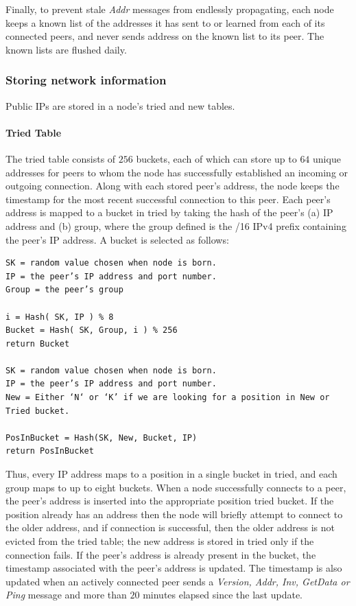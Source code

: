 Finally, to prevent stale \textsl{Addr} messages from endlessly propagating, each node keeps a known list of the addresses it has sent to or learned from each of its connected peers, and never sends address on the known list to its peer. The known lists are flushed daily.

\subsubsection*{Storing network information}
Public IPs are stored in a node’s tried and new tables.
\paragraph*{Tried Table}
The tried table consists of $256$ buckets, each of which can store up to $64$ unique addresses for peers to whom the node has successfully established an incoming or outgoing connection. Along with each stored peer’s address, the node keeps the timestamp for the most recent successful connection to this peer.
Each peer’s address is mapped to a bucket in tried by taking the hash of the peer’s (a) IP address and (b) group, where the group defined is the /16 IPv4 prefix containing the peer’s IP address. A bucket is selected as follows:
\begin{verbatim}
SK = random value chosen when node is born.
IP = the peer’s IP address and port number.
Group = the peer’s group

i = Hash( SK, IP ) % 8
Bucket = Hash( SK, Group, i ) % 256
return Bucket

SK = random value chosen when node is born.
IP = the peer’s IP address and port number.
New = Either ‘N‘ or ‘K’ if we are looking for a position in New or Tried bucket.

PosInBucket = Hash(SK, New, Bucket, IP)
return PosInBucket
\end{verbatim}

Thus, every IP address maps to a position in a single bucket in tried, and each group maps to up to eight buckets. When a node successfully connects to a peer, the peer’s address is inserted into the appropriate position tried bucket. If the position already has an address then the node will briefly attempt to connect to the older address, and if connection is successful, then the older address is not evicted from the tried table; the new address is stored in tried only if the connection fails. If the peer’s address is already present in the bucket, the timestamp associated with the peer’s address is updated. The timestamp is also updated when an actively connected peer sends a \textsl{Version, Addr, Inv, GetData or Ping} message and more than $20$ minutes elapsed since the last update.


